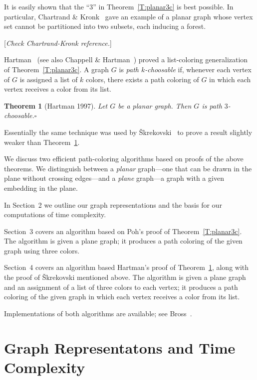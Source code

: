 \documentclass[12pt,letterpaper]{article}
\theoremstyle{plain}
\newtheorem{theorem}[lemma]{Theorem}         %
\theoremstyle{definition}
\newcommand{\ggcqedsymbol}{$\square$}
\newcommand{\ggcqed}{\hbox{}\nobreak\hbox{\quad\ggcqedsymbol}}
\newcommand{\ggcnopf}{\ggcqed}
\newcommand{\defterm}[1]{\emph{#1}} %
\begin{document}
It is easily shown that the ``$3$'' in Theorem~\ref{T:planar3c}
is best possible.
In particular, Chartrand \& Kronk~\cite{ChKr1969} gave an example
of a planar graph whose vertex set cannot be partitioned
into two subsets, each inducing a forest.

[\textit{Check Chartrand-Kronk reference.}] %

Hartman~\cite[Thm.~4.1]{Har1997}
(see also Chappell \& Hartman~\cite[Thm.~2.1]{ChHa2017prep})
proved a list-coloring generalization of Theorem~\ref{T:planar3c}.
A graph $G$ is \defterm{path $k$-choosable} if,
whenever each vertex of $G$ is assigned a list of $k$ colors,
there exists a path coloring of $G$ in which each vertex receives
a color from its list.

\begin{theorem}[Hartman 1997] \label{T:planar3}
Let $G$ be a planar graph.
Then $G$ is path $3$-choosable.\ggcnopf\end{theorem}

Essentially the same technique was used by
\v{S}krekovski~\cite[Thm.~2.2b]{Skr1999}
to prove a result slightly weaker than Theorem~\ref{T:planar3}.


\medskip

We discuss two efficient path-coloring algorithms
based on proofs of the above theorems.
We distinguish between a \defterm{planar} graph---one that
can be drawn in the plane without crossing edges---and
a \defterm{plane} graph---a graph with a given embedding
in the plane.

In Section~2 we outline our graph representations
and the basis for our computations of time complexity.

Section~3 covers an algorithm
based on Poh's proof of Theorem~\ref{T:planar3c}.
The algorithm is given a plane graph;
it produces a path coloring of the given graph
using three colors.

Section~4 covers an algorithm
based Hartman's proof of Theorem~\ref{T:planar3},
along with the proof of \v{S}krekovski mentioned above.
The algorithm is given a plane graph
and an assignment of a list of three colors to each vertex;
it produces a path coloring of the given graph
in which each vertex receives a color from its list.

Implementations of both algorithms are available;
see Bross~\cite{Bro2017}.


\section{Graph Representatons and Time Complexity}
\end{document}
